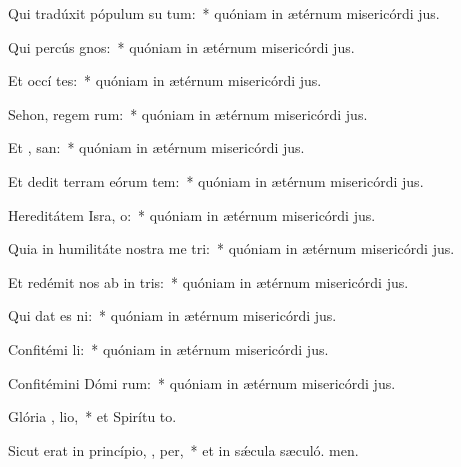 \item Qui tradúxit pópulum su  tum:~* quóniam in ætérnum misericórdi jus.
\item Qui percús  gnos:~* quóniam in ætérnum misericórdi jus.
\item Et occí  tes:~* quóniam in ætérnum misericórdi jus.
\item Sehon, regem rum:~* quóniam in ætérnum misericórdi jus.
\item Et ,  san:~* quóniam in ætérnum misericórdi jus.
\item Et dedit terram eórum tem:~* quóniam in ætérnum misericórdi jus.
\item Hereditátem Isra,  o:~* quóniam in ætérnum misericórdi jus.
\item Quia in humilitáte nostra me  tri:~* quóniam in ætérnum misericórdi jus.
\item Et redémit nos ab in tris:~* quóniam in ætérnum misericórdi jus.
\item Qui dat es  ni:~* quóniam in ætérnum misericórdi jus.
\item Confitémi  li:~* quóniam in ætérnum misericórdi jus.
\item Confitémini Dómi rum:~* quóniam in ætérnum misericórdi jus.
\item Glória ,  lio,~* et Spirítu to.
\item Sicut erat in princípio,  ,  per,~* et in sǽcula sæculó. men.

